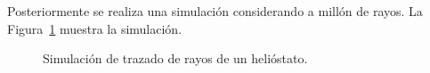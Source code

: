 Posteriormente se realiza una simulación considerando a millón de rayos. La Figura~\ref{fig:rayHelio} muestra la simulación.

\begin{figure}[ht]
  \centering
  \caption{\label{fig:rayHelio} Simulación de trazado de rayos de un helióstato.}
\end{figure}



